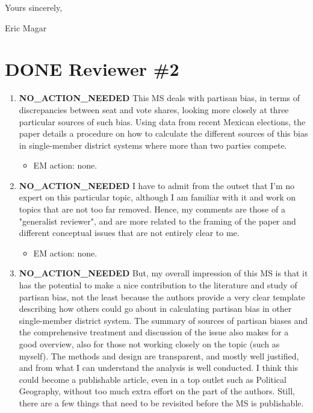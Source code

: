 \documentclass{article}
\begin{document}
Yours sincerely,

Eric Magar

\section{{\bfseries\sffamily DONE} Reviewer \#2}
\label{sec:orgheadline15}
\begin{enumerate}
\item {\bfseries\sffamily NO\_ACTION\_NEEDED} This MS deals with partisan bias, in terms of discrepancies between seat and vote shares, looking more closely at three particular sources of such bias. Using data from recent Mexican elections, the paper details a procedure on how to calculate the different sources of this bias in single-member district systems where more than two parties compete.
\label{sec:orgheadline2}
\begin{itemize}
\item EM action: none.
\end{itemize}
\item {\bfseries\sffamily NO\_ACTION\_NEEDED} I have to admit from the outset that I'm no expert on this particular topic, although I am familiar with it and work on topics that are not too far removed. Hence, my comments are those of a "generalist reviewer", and are more related to the framing of the paper and different conceptual issues that are not entirely clear to me.
\label{sec:orgheadline3}
\begin{itemize}
\item EM action: none.
\end{itemize}
\item {\bfseries\sffamily NO\_ACTION\_NEEDED} But, my overall impression of this MS is that it has the potential to make a nice contribution to the literature and study of partisan bias, not the least because the authors provide a very clear template describing how others could go about in calculating partisan bias in other single-member district system. The summary of sources of partisan biases and the comprehensive treatment and discussion of the issue also makes for a good overview, also for those not working closely on the topic (such as myself). The methods and design are transparent, and mostly well justified, and from what I can understand the analysis is well conducted. I think this could become a publishable article, even in a top outlet such as Political Geography, without too much extra effort on the part of the authors. Still, there are a few things that need to be revisited before the MS is publishable.

\end{enumerate}
\end{document}
